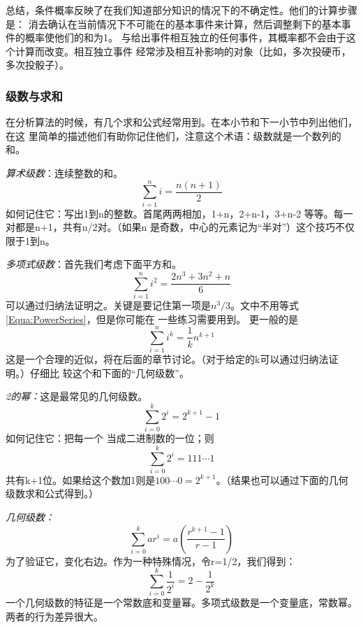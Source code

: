 总结，条件概率反映了在我们知道部分知识的情况下的不确定性。他们的计算步骤是：
消去确认在当前情况下不可能在的基本事件来计算，然后调整剩下的基本事件的概率使他们的和为1。
与给出事件相互独立的任何事件，其概率都不会由于这个计算而改变。相互独立事件
经常涉及相互补影响的对象（比如，多次投硬币，多次投骰子）。

\subsubsection{级数与求和}
在分析算法的时候，有几个求和公式经常用到。在本小节和下一小节中列出他们，在这
里简单的描述他们有助你记住他们，注意这个术语：级数就是一个数列的和。

\emph{算术级数}：连续整数的和。
\begin{equation}
    \sum_{i=1}^n i=\frac{n(n+1)}{2}
\end{equation}
如何记住它：写出1到n的整数。首尾两两相加，1+n，2+n-1，3+n-2
等等。每一对都是n+1，共有n/2对。（如果n
是奇数，中心的元素记为“半对”）这个技巧不仅限于1到n。

\emph{多项式级数}：首先我们考虑下面平方和。
\begin{equation}\label{Equa:PowerSeries}
    \sum_{i=1}^n i^2=\frac{2n^3+3n^2+n}{6}
\end{equation}
可以通过归纳法证明之。关键是要记住第一项是$n^3/3$。文中不用等式\ref{Equa:PowerSeries}，但是你可能在
一些练习需要用到。 更一般的是
\begin{equation}
    \sum_{i=1}^n i^k=\frac{1}{k}n^{k+1}
\end{equation}
这是一个合理的近似，将在后面的章节讨论。（对于给定的k可以通过归纳法证明。）仔细比
较这个和下面的“几何级数”。

\emph{2的幂：}这是最常见的几何级数。
\begin{equation}\label{Equa:PowerOf2}
    \sum_{i=0}^{k}2^i = 2^{k+1}-1
\end{equation}
如何记住它：把每一个 当成二进制数的一位；则
\begin{displaymath}
    \sum_{i=0}^{k}2^i = 111\cdots 1
\end{displaymath}
共有k+1位。如果给这个数加1则是$100\cdots
0=2^{k+1}$。（结果也可以通过下面的几何级数求和公式得到。）

\emph{几何级数：}
\begin{equation}
    \sum_{i=0}^{k}ar^i = a\left( \frac{r^{k+1}-1}{r-1} \right)
\end{equation}
为了验证它，变化右边。作为一种特殊情况，令r=1/2，我们得到：
\begin{equation}
    \sum_{i=0}^{k}\frac{1}{2^i} =2-\frac{1}{2^k}
\end{equation}
一个几何级数的特征是一个常数底和变量幂。多项式级数是一个变量底，常数幂。两者的行为差异很大。


